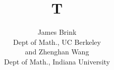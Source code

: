 \documentclass{amsart}
\begin{document}
\title{T}
\author{James Brink \\Dept of Math., UC Berkeley  \\and Zhenghan Wang \\Dept of Math., Indiana University}
\maketitle
\end{document}
